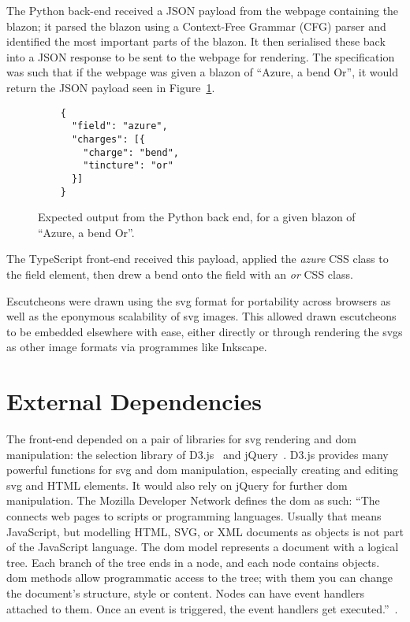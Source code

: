\documentclass[nobib, a4paper, twoside, justified]{tufte-book}
\makeatletter
\newcommand{\svg}{\gls{svg}\@\xspace}
\newcommand{\svgs}{\glspl{svg}\@\xspace}
\newcommand{\dom}{\gls{dom}\@\xspace}
\newcommand{\blazon}{\gls{blazon}\@\xspace}
\makeatother
\begin{document}
The Python back-end received a JSON payload from the webpage containing the \blazon; it parsed the
\blazon using a Context-Free Grammar (CFG) parser and identified the most important parts of the
\blazon. It then serialised these back into a JSON response to be sent to the webpage for rendering.
The specification was such that if the webpage was given a \blazon of ``Azure, a bend Or'', it would
return the JSON payload seen in Figure~\ref{fig:expected_output}.

\begin{figure}[h]
  \begin{verbatim}
    {
      "field": "azure",
      "charges": [{
        "charge": "bend",
        "tincture": "or"
      }]
    }
  \end{verbatim}
  \caption{Expected output from the Python back end, for a given \blazon of ``Azure, a bend Or''.}%
  \label{fig:expected_output}
\end{figure}

The TypeScript front-end received this payload, applied the \textit{azure} CSS class to the field
element, then drew a bend onto the field with an \textit{or} CSS class.

Escutcheons were drawn using the \svg{} format for portability across browsers as well as the
eponymous scalability of \svg{} images. This allowed drawn escutcheons to be embedded elsewhere
with ease, either directly or through rendering the \svgs{} as other image formats via programmes
like Inkscape.

\section{External Dependencies}%
\label{sec:external_dependencies}

The front-end depended on a pair of libraries for \svg{} rendering and \dom{} manipulation: the
selection library of D3.js~\autocite{d3js} and jQuery~\autocite{jquery}. D3.js provides many
powerful functions for \svg{} and \dom{} manipulation, especially creating and editing \svg{} and
HTML elements. It would also rely on jQuery for further \dom{} manipulation. The Mozilla Developer
Network defines the \dom{} as such: ``The  connects web pages to scripts or
programming languages. Usually that means JavaScript, but modelling HTML, SVG, or XML documents as
objects is not part of the JavaScript language. The \dom{} model represents a document with a
logical tree. Each branch of the tree ends in a node, and each node contains objects.  \dom{}
methods allow programmatic access to the tree; with them you can change the document's structure,
style or content. Nodes can have event handlers attached to them. Once an event is triggered, the
event handlers get executed.''~\autocite{mdn_dom}.
\end{document}
